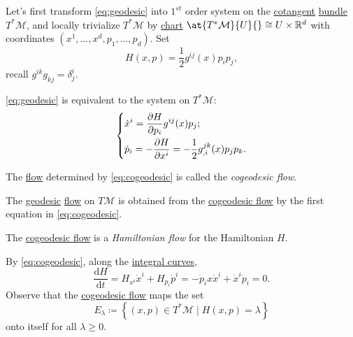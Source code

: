 Let's first transform \autoref{eq:geodesic} into \(1^{st} \) order system on the \hyperref[def:cotangent-space]{cotangent} \hyperref[def:vector-bundle]{bundle} \(T^{\ast} \mathcal{M} \), and locally trivialize \(T^{\ast} \mathcal{M} \) by \hyperref[def:coordinate-chart]{chart} \(\at{T^{\ast} \mathcal{M} }{U}{} \cong U \times \mathbb{R} ^d\) with coordinates \((x^1, \ldots , x^d, p_1, \ldots , p_d)\). Set
\begin{equation}\label{eq:Hamilton}
	H(x, p) = \frac{1}{2} g^{ij} (x) p_i p_j,
\end{equation}
recall \(g^{ik} g_{kj} = \delta ^i_j \).

\begin{theorem}
	\autoref{eq:geodesic} is equivalent to the system on \(T^{\ast} \mathcal{M} \):
	\begin{equation}\label{eq:cogeodesic}
		\begin{dcases}
			\dot{x}^i = \frac{\partial H}{\partial p_i} g^{ij}(x) p_j; \\
			\dot{p}_i = -\frac{\partial H}{\partial x^i} = -\frac{1}{2} g^{jk}_{, i}(x)p_j p_k.
		\end{dcases}
	\end{equation}
\end{theorem}

\begin{remark}\label{rmk:cogeodesic-flow}
	The \hyperref[def:local-flow]{flow} determined by \autoref{eq:cogeodesic} is called the \emph{cogeodesic flow}.
\end{remark}

\begin{note}
	The \hyperref[def:geodesic]{geodesic} \hyperref[def:local-flow]{flow} on \(T\mathcal{M} \) is obtained from the \hyperref[rmk:cogeodesic-flow]{cogeodesic flow} by the first equation in \autoref{eq:cogeodesic}.
\end{note}

\begin{remark}
	The \hyperref[rmk:cogeodesic-flow]{cogeodesic flow} is a \emph{Hamiltonian flow} for the Hamiltonian \(H\).
\end{remark}
\begin{explanation}
	By \autoref{eq:cogeodesic}, along the \hyperref[def:integral-curve]{integral curves},
	\[
		\frac{\mathrm{d}H}{\mathrm{d}t}
		= H_{x^i} \dot{x}^i + H_{p_i}\dot{p}^i
		= -\dot{p}_i x\dot{x}^i + \dot{x}^i \dot{p}_i = 0.
	\]
	Observe that the \hyperref[rmk:cogeodesic-flow]{cogeodesic flow} maps the set
	\[
		E_\lambda \coloneqq \left\{ (x, p)\in T^{\ast} \mathcal{M} \mid H(x, p) = \lambda  \right\}
	\]
	onto itself for all \(\lambda \geq 0\).
\end{explanation}

